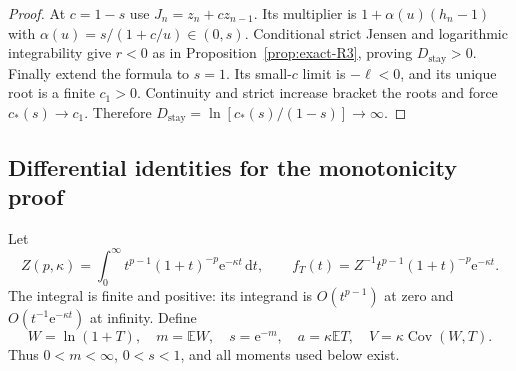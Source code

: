 \begin{proof}
At $c=1-s$ use $J_n=z_n+cz_{n-1}$. Its multiplier is $1+\alpha(u)(h_n-1)$ with $\alpha(u)=s/(1+c/u)\in(0,s)$. Conditional strict Jensen and logarithmic integrability give $r<0$ as in Proposition~\ref{prop:exact-R3}, proving $D_{\mathrm{stay}}>0$. Finally extend the formula to $s=1$. Its small-$c$ limit is $-\ell<0$, and its unique root is a finite $c_1>0$. Continuity and strict increase bracket the roots and force $c_*(s)\to c_1$. Therefore $D_{\mathrm{stay}}=\ln[c_*(s)/(1-s)]\to\infty$.
\end{proof}

\subsection{Differential identities for the monotonicity proof}

Let
\begin{equation}
 Z(p,\kappa)=\int_0^\infty t^{p-1}(1+t)^{-p}\mathrm{e}^{-\kappa t}\,\mathrm{d}t,
 \qquad f_T(t)=Z^{-1}t^{p-1}(1+t)^{-p}\mathrm{e}^{-\kappa t}.
\end{equation}
The integral is finite and positive: its integrand is \(O(t^{p-1})\) at zero and \(O(t^{-1}\mathrm{e}^{-\kappa t})\) at infinity. Define
\begin{equation}
 W=\ln(1+T),\quad m=\mathbb{E}W,\quad s=\mathrm{e}^{-m},\quad
 a=\kappa \mathbb{E}T,\quad V=\kappa\operatorname{Cov}(W,T).
\end{equation}
Thus \(0<m<\infty\), \(0<s<1\), and all moments used below exist.

